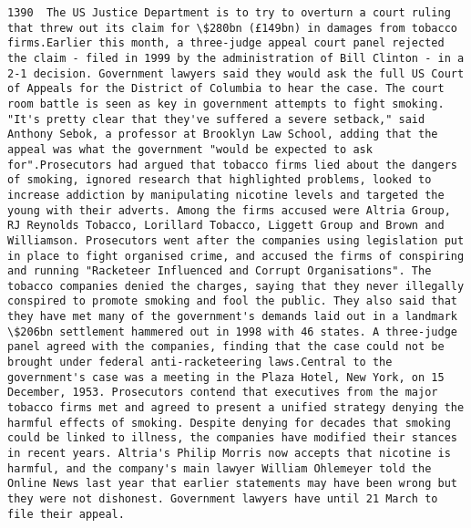 \documentclass[11pt]{article}
\begin{document}
\begin{Verbatim}[commandchars=\\\{\}]
         1390  The US Justice Department is to try to overturn a court ruling that threw out its claim for \$280bn (£149bn) in damages from tobacco firms.Earlier this month, a three-judge appeal court panel rejected the claim - filed in 1999 by the administration of Bill Clinton - in a 2-1 decision. Government lawyers said they would ask the full US Court of Appeals for the District of Columbia to hear the case. The court room battle is seen as key in government attempts to fight smoking. "It's pretty clear that they've suffered a severe setback," said Anthony Sebok, a professor at Brooklyn Law School, adding that the appeal was what the government "would be expected to ask for".Prosecutors had argued that tobacco firms lied about the dangers of smoking, ignored research that highlighted problems, looked to increase addiction by manipulating nicotine levels and targeted the young with their adverts. Among the firms accused were Altria Group, RJ Reynolds Tobacco, Lorillard Tobacco, Liggett Group and Brown and Williamson. Prosecutors went after the companies using legislation put in place to fight organised crime, and accused the firms of conspiring and running "Racketeer Influenced and Corrupt Organisations". The tobacco companies denied the charges, saying that they never illegally conspired to promote smoking and fool the public. They also said that they have met many of the government's demands laid out in a landmark \$206bn settlement hammered out in 1998 with 46 states. A three-judge panel agreed with the companies, finding that the case could not be brought under federal anti-racketeering laws.Central to the government's case was a meeting in the Plaza Hotel, New York, on 15 December, 1953. Prosecutors contend that executives from the major tobacco firms met and agreed to present a unified strategy denying the harmful effects of smoking. Despite denying for decades that smoking could be linked to illness, the companies have modified their stances in recent years. Altria's Philip Morris now accepts that nicotine is harmful, and the company's main lawyer William Ohlemeyer told the Online News last year that earlier statements may have been wrong but they were not dishonest. Government lawyers have until 21 March to file their appeal.                                                                                                                                                                                                                                                                                                                                                                                                                                                                                                                                                                                                                                                                                                                                                                                                                                                                                                                                                                                                                                                              
\end{Verbatim}
\end{document}
